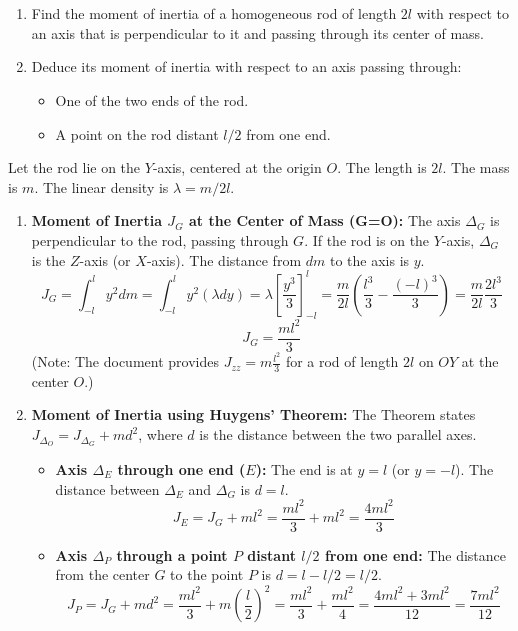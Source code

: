 \documentclass[12pt]{article}
\begin{document}
\section{}

\begin{enumerate}
    \item Find the moment of inertia of a homogeneous rod of length $2l$ with respect to an axis that is perpendicular to it and passing through its center of mass.
    \item Deduce its moment of inertia with respect to an axis passing through:
    \begin{itemize}
        \item One of the two ends of the rod.
        \item A point on the rod distant $l/2$ from one end.
    \end{itemize}
\end{enumerate}

\begin{correctionbox}
Let the rod lie on the $Y$-axis, centered at the origin $O$. The length is $2l$. The mass is $m$. The linear density is $\lambda = m/2l$.

\begin{enumerate}
    \item \textbf{Moment of Inertia $J_G$ at the Center of Mass (G=O):}
        The axis $\Delta_G$ is perpendicular to the rod, passing through $G$. If the rod is on the $Y$-axis, $\Delta_G$ is the $Z$-axis (or $X$-axis). The distance from $dm$ to the axis is $y$.
        $$J_G = \int_{-l}^{l} y^2 dm = \int_{-l}^{l} y^2 (\lambda dy) = \lambda \left[\frac{y^3}{3}\right]_{-l}^{l} = \frac{m}{2l} \left(\frac{l^3}{3} - \frac{(-l)^3}{3}\right) = \frac{m}{2l} \frac{2l^3}{3}$$
        $$J_G = \frac{ml^2}{3}$$
        (Note: The document provides $J_{zz} = m \frac{l^2}{3}$ for a rod of length $2l$ on $OY$ at the center $O$.)
    \item \textbf{Moment of Inertia using Huygens' Theorem:}
        The Theorem states $J_{\Delta_O}=J_{\Delta_G}+md^2$, where $d$ is the distance between the two parallel axes.
        \begin{itemize}
            \item \textbf{Axis $\Delta_E$ through one end ($E$):}
                The end is at $y=l$ (or $y=-l$). The distance between $\Delta_E$ and $\Delta_G$ is $d=l$.
                $$J_E = J_G + ml^2 = \frac{ml^2}{3} + ml^2 = \frac{4ml^2}{3}$$
            \item \textbf{Axis $\Delta_P$ through a point $P$ distant $l/2$ from one end:}
                The distance from the center $G$ to the point $P$ is $d = l - l/2 = l/2$.
                $$J_P = J_G + m d^2 = \frac{ml^2}{3} + m \left(\frac{l}{2}\right)^2 = \frac{ml^2}{3} + \frac{ml^2}{4} = \frac{4ml^2+3ml^2}{12} = \frac{7ml^2}{12}$$
        \end{itemize}
\end{enumerate}

\end{correctionbox}
\end{document}
